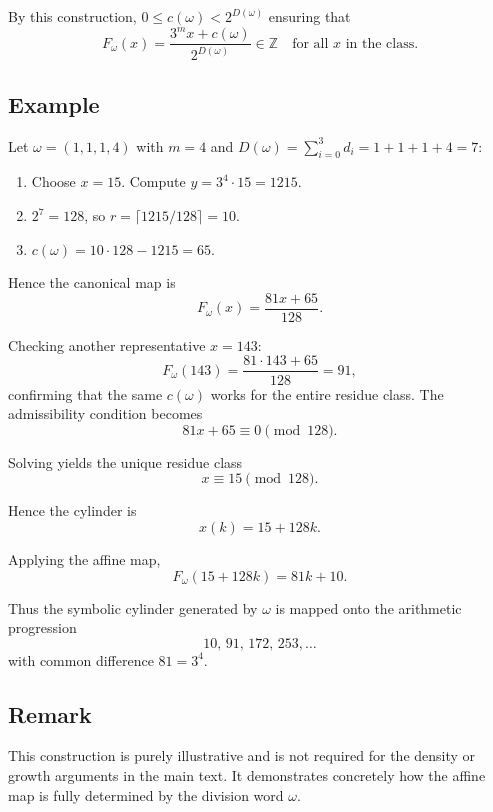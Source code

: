 \documentclass[12pt, oneside]{article}
\numberwithin{equation}{section}
\theoremstyle{definition}
\theoremstyle{plain}
\theoremstyle{remark}
\begin{document}
By this construction, \(0 \le c(\omega) < 2^{D(\omega)}\) ensuring that
\[
F_\omega(x) = \frac{3^m x + c(\omega)}{2^{D(\omega)}} \in \mathbb{Z} \quad \text{for all } x \text{ in the class.}
\]

\newpage
\subsection{Example}

Let \(\omega = (1,1,1,4)\) with \(m=4\) and \(D(\omega) = \sum_{i=0}^{3} d_i = 1 + 1 + 1 + 4 = 7\):

\begin{enumerate}
\item Choose \(x = 15\). Compute \(y = 3^4 \cdot 15 = 1215\).  
\item \(2^7 = 128\), so \(r = \lceil 1215/128 \rceil = 10\).  
\item \(c(\omega) = 10 \cdot 128 - 1215 = 65\).  
\end{enumerate}

Hence the canonical map is
\[
F_\omega(x) = \frac{81x + 65}{128}.
\]

Checking another representative \(x = 143\):
\[
F_\omega(143) = \frac{81 \cdot 143 + 65}{128} = 91,
\]
confirming that the same \(c(\omega)\) works for the entire residue class.
The admissibility condition becomes
\[
81x+65\equiv0\pmod{128}.
\]

Solving yields the unique residue class
\[
x\equiv15\pmod{128}.
\]

Hence the cylinder is
\[
x(k)=15+128k.
\]

Applying the affine map,
\[
F_\omega(15+128k)
=
81k+10.
\]

Thus the symbolic cylinder generated by \(\omega\) is mapped onto the
arithmetic progression
\[
10,\,91,\,172,\,253,\dots
\]
with common difference \(81=3^4\).

\subsection*{Remark}

This construction is purely illustrative and is not required for the density
or growth arguments in the main text. It demonstrates concretely how the affine
map is fully determined by the division word \(\omega\).
\end{document}
